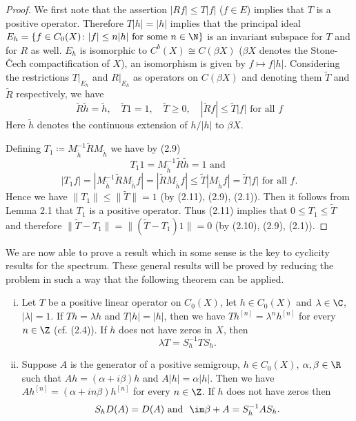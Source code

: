 \begin{proof}
	We first note that the assertion $|Rf| \leq T|f|$ ($f \in E$) implies that $T$ is a positive operator.
	Therefore $T|h| = |h|$ implies that the principal ideal $E_{h} = \{f \in C_{0}(X) \colon |f| \leq n|h| \text{ for some } n \in \N\}$ is an invariant subspace for $T$ and for $R$ as well.
	$E_{h}$ is isomorphic to $C^{b}(X) \cong C(\beta X)$ ($\beta X$ denotes the Stone-Čech compactification of $X$), an isomorphism is given by $f \mapsto f|h|$.
	Considering the restrictions $T|_{E_{h}}$ and $R|_{E_{h}}$ as operators on $C(\beta X)$ and denoting them $\tilde{T}$ and $\tilde{R}$ respectively, we have
\begin{equation}\label{eq:b3-2.9}
		\tilde{R}\tilde{h} = \tilde{h}, \quad \tilde{T}1 = 1, \quad \tilde{T} \geq 0, \quad |\tilde{R}f| \leq \tilde{T}|f| \text{ for all } f
	\end{equation}
%
	Here $\tilde{h}$ denotes the continuous extension of $h/|h|$ to $\beta X$.
	
	Defining $T_{1} \coloneqq M_{\tilde{h}}^{-1}\tilde{R}M_{\tilde{h}}$ we have by (2.9)
	\begin{equation}
	T_{1}1 = M_{\tilde{h}}^{-1}\tilde{R}\tilde{h} = 1 \text{ and }
	\end{equation}
	\begin{equation}
	|T_{1}f| = |M_{\tilde{h}}^{-1}\tilde{R}M_{\tilde{h}}f| = |\tilde{R}M_{\tilde{h}}f| \leq \tilde{T}|M_{\tilde{h}}f| = \tilde{T}|f| \text{ for all } f.
	\end{equation}
	Hence we have $\|T_{1}\| \leq \|\tilde{T}\| = 1$ (by (2.11), (2.9), (2.1)).
	Then it follows from Lemma 2.1 that $T_{1}$ is a positive operator.
	Thus (2.11) implies that $0 \leq T_{1} \leq \tilde{T}$ and therefore $\|\tilde{T} - T_{1}\| = \|(\tilde{T} - T_{1})1\| = 0$ (by (2.10), (2.9), (2.1)).
\end{proof}
We are now able to prove a result which in some sense is the key to cyclicity results for the spectrum.
	These general results will be proved by reducing the problem in such a way that the following theorem can be applied.
\begin{theorem}\label{thm:b3-2.4}
\begin{enumerate}[(i)]	
\item
Let $T$ be a positive linear operator on $C_{0}(X)$, let $h \in C_{0}(X)$ and $\lambda \in \C$, $|\lambda| = 1$.
	If $Th = \lambda h$ and $T|h| = |h|$, then we have $Th^{[n]} = \lambda^{n}h^{[n]}$ for every $n \in \Z$ (cf. (2.4)).
	If $h$ does not have zeros in $X$, then 
	\[
	\lambda T = S_{h}^{-1}TS_{h}.
	\]
\item
Suppose $A$ is the generator of a positive semigroup, $h \in C_{0}(X)$, $\alpha,\beta \in \R$ such that $Ah = (\alpha+i\beta)h$ and $A|h| = \alpha|h|$. 
	Then we have $Ah^{[n]} = (\alpha+in\beta)h^{[n]}$ for every $n \in \Z$.
	If $h$ does not have zeros then 
	\[
	S_{h}D(A) = D(A) \text{ and \ } \im\beta + A = S_{h}^{-1}AS_{h}.
	\]
\end{enumerate}
\end{theorem}
